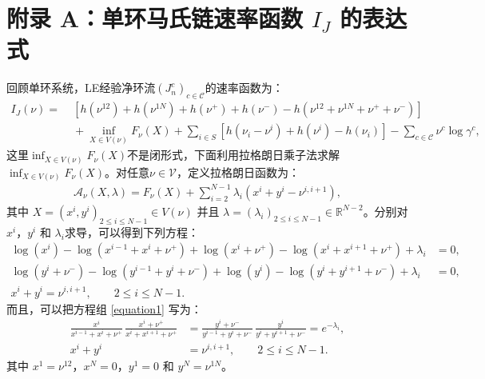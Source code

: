 \section{附录 A：单环马氏链速率函数 $I_J$ 的表达式 }{} \label{appendix:explicit}
回顾单环系统，LE经验净环流$(J_n^c)_{c \in \mathcal{C}}$的速率函数为：
\begin{equation*}\label{ratefunction2}
	\begin{split}
		I_J(\nu) =&\; \left[h\left(\nu^{12}\right)+h\left(\nu^{1N}\right)
		+h\left(\nu^+\right)+h\left(\nu^-\right)-h\left(\nu^{12}+\nu^{1N}+\nu^++\nu^-\right)\right] \\
		&\;+\inf_{X\in V(\nu)}F_{\nu}(X)+\sum_{i\in S}\left[ h\left(\nu_i-\nu^i\right)+h\left(\nu^i\right)
		-h\left(\nu_i\right)\right]-\sum_{c\in\mathcal{C}}\nu^c\log\gamma^c,
	\end{split}
\end{equation*}
这里$\inf_{X\in V(\nu)}F_{\nu}(X)$不是闭形式，下面利用拉格朗日乘子法求解$\inf_{X\in V(\nu)}F_{\nu}(X)$。对任意$\nu\in\mathcal{V}$，定义拉格朗日函数为：
\begin{align*}
    \mathcal{A}_{\nu}(X,\lambda) = F_{\nu}(X) + \sum_{i=2}^{N-1} \lambda_i \left(x^{i} + y^{i} - \nu^{i,i+1}\right),
\end{align*}
其中 $X=(x^i,y^i)_{2\le i\le N-1}\in V(\nu)$ 并且 $\lambda=(\lambda_i)_{2\le i\le N-1}\in \mathbb{R}^{N-2}$。分别对 $x^{i}$，$y^{i}$ 和 $\lambda_i$求导，可以得到下列方程：
\begin{equation}\label{equation1}
	\begin{split}
		\log\left(x^{i}\right) - \log\left(x^{i-1}+x^{i}+\nu^{+}\right)  + \log\left(x^{i}+\nu^{+}\right) -\log\left(x^{i}+x^{i+1}+\nu^{+}\right)+\lambda_i  &= 0, \\
		\log\left(y^{i}+\nu^{-}\right) -\log\left(y^{i-1}+y^{i}+\nu^{-}\right)  + \log\left(y^{i}\right) - \log\left(y^{i}+y^{i+1}+\nu^{-}\right) +\lambda_i &= 0, \\
		x^{i} + y^{i} = \nu^{i,i+1},\qquad 2\le i\le N-1.\qquad\qquad\qquad
	\end{split}
\end{equation}
而且，可以把方程组 \eqref{equation1} 写为：
\begin{equation}\label{equations}
    \begin{split}
    \frac{x^{i}}{x^{i-1}+x^{i}+\nu^+}
    \,\frac{x^{i}+\nu^+}{x^{i}+x^{i+1}+\nu^+}
    &= \frac{y^{i}+\nu^-}{y^{i-1}+y^{i}+\nu^-}
    \,\frac{y^{i}}{y^{i}+y^{i+1}+\nu^-}=e^{-\lambda_i},\\
    x^{i} + y^{i} &= \nu^{i,i+1},\qquad 2\le i\le N-1.
    \end{split}
\end{equation}
其中 $x^1=\nu^{12}$，$x^N=0$，$y^1=0$ 和 $y^N=\nu^{1N}$。

